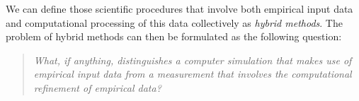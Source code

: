 \documentclass[12pt, a4paper]{article}
\numberwithin{equation}{section}
\begin{document}

We can define those scientific procedures that involve both empirical input data and computational processing of this data collectively as {\em hybrid methods}. The problem of hybrid methods can then be formulated as the following question: 

\begin{quote}
{\em What, if anything, distinguishes a computer simulation that makes use of empirical input data from a measurement that involves the computational refinement of empirical data?}
\end{quote}
\end{document}
